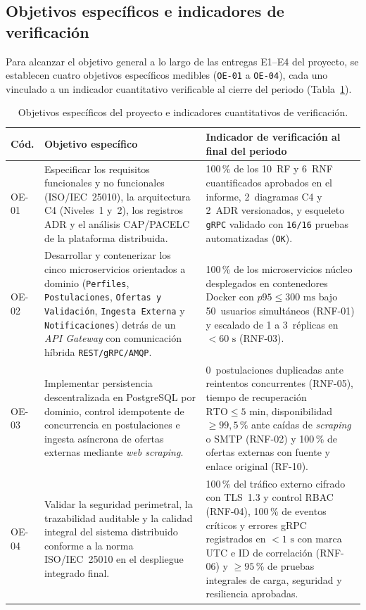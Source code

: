 \documentclass[11pt,a4paper]{article}
\begin{document}
\subsection{Objetivos específicos e indicadores de verificación}

Para alcanzar el objetivo general a lo largo de las entregas E1--E4 del proyecto, se establecen cuatro objetivos específicos medibles (\texttt{OE-01} a \texttt{OE-04}), cada uno vinculado a un indicador cuantitativo verificable al cierre del periodo (Tabla~\ref{tab:objetivos}).

\begin{table}[htbp]
\centering
\caption{Objetivos específicos del proyecto e indicadores cuantitativos de verificación.}
\label{tab:objetivos}
\small
\begin{tabularx}{\textwidth}{l >{\raggedright\arraybackslash}p{6.2cm} X}
\toprule
\textbf{Cód.} & \textbf{Objetivo específico} & \textbf{Indicador de verificación al final del periodo} \\
\midrule
OE-01 & Especificar los requisitos funcionales y no funcionales (ISO/IEC~25010), la arquitectura C4 (Niveles~1 y~2), los registros ADR y el análisis CAP/PACELC de la plataforma distribuida. & 100\,\% de los 10~RF y 6~RNF cuantificados aprobados en el informe, 2~diagramas C4 y 2~ADR versionados, y esqueleto \texttt{gRPC} validado con \texttt{16/16} pruebas automatizadas (\texttt{OK}). \\
OE-02 & Desarrollar y contenerizar los cinco microservicios orientados a dominio (\texttt{Perfiles}, \texttt{Postulaciones}, \texttt{Ofertas y Validación}, \texttt{Ingesta Externa} y \texttt{Notificaciones}) detrás de un \textit{API Gateway} con comunicación híbrida \texttt{REST/gRPC/AMQP}. & 100\,\% de los microservicios núcleo desplegados en contenedores Docker con $p95 \le 300\text{ ms}$ bajo 50~usuarios simultáneos (RNF-01) y escalado de 1 a 3~réplicas en $< 60\text{ s}$ (RNF-03). \\
OE-03 & Implementar persistencia descentralizada en PostgreSQL por dominio, control idempotente de concurrencia en postulaciones e ingesta asíncrona de ofertas externas mediante \textit{web scraping}. & 0~postulaciones duplicadas ante reintentos concurrentes (RNF-05), tiempo de recuperación $\text{RTO} \le 5\text{ min}$, disponibilidad $\ge 99{,}5$\,\% ante caídas de \textit{scraping} o SMTP (RNF-02) y 100\,\% de ofertas externas con fuente y enlace original (RF-10). \\
OE-04 & Validar la seguridad perimetral, la trazabilidad auditable y la calidad integral del sistema distribuido conforme a la norma ISO/IEC~25010 en el despliegue integrado final. & 100\,\% del tráfico externo cifrado con TLS~1.3 y control RBAC (RNF-04), 100\,\% de eventos críticos y errores gRPC registrados en $< 1\text{ s}$ con marca UTC e ID de correlación (RNF-06) y $\ge 95$\,\% de pruebas integrales de carga, seguridad y resiliencia aprobadas. \\
\bottomrule
\end{tabularx}
\end{table}
\end{document}
